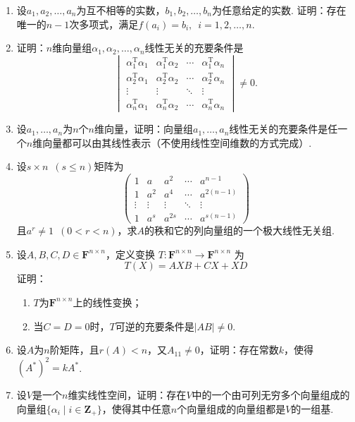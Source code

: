 \begin{enumerate}
    \item 设$a_1,a_2,\ldots,a_n$为互不相等的实数，$b_1,b_2,\ldots,b_n$为任意给定的实数. 证明：存在唯一的$n-1$次多项式，满足$f(a_i)=b_i,\enspace i=1,2,\ldots,n$.

    \item 证明：$n$维向量组$\alpha_1,\alpha_2,\ldots,\alpha_n$线性无关的充要条件是
          \[\begin{vmatrix}
                  \alpha_1^\mathrm{T}\alpha_1 & \alpha_1^\mathrm{T}\alpha_2 & \cdots & \alpha_1^\mathrm{T}\alpha_n \\
                  \alpha_2^\mathrm{T}\alpha_1 & \alpha_2^\mathrm{T}\alpha_2 & \cdots & \alpha_2^\mathrm{T}\alpha_n \\
                  \vdots                      & \vdots                      & \ddots & \vdots                      \\
                  \alpha_n^\mathrm{T}\alpha_1 & \alpha_n^\mathrm{T}\alpha_2 & \cdots & \alpha_n^\mathrm{T}\alpha_n
              \end{vmatrix}\neq 0.\]

    \item 设$a_1,\ldots,a_n$为$n$个$n$维向量，证明：向量组$a_1,\ldots,a_n$线性无关的充要条件是任一个$n$维向量都可以由其线性表示（不使用线性空间维数的方式完成）.

    \item 设$s \times n\enspace(s\leqslant n)$矩阵为
          \[\begin{pmatrix}
                  1      & a      & a^2    & \cdots & a^{n-1}    \\
                  1      & a^2    & a^4    & \cdots & a^{2(n-1)} \\
                  \vdots & \vdots & \vdots & \ddots & \vdots     \\
                  1      & a^s    & a^{2s} & \cdots & a^{s(n-1)}
              \end{pmatrix}\]
          且$a^r\neq 1\enspace(0<r<n)$，求$A$的秩和它的列向量组的一个极大线性无关组.

    \item 设$A,B,C,D \in \mathbf{F}^{n \times n}$，定义变换 $ T : \mathbf{F}^{n \times n} \to \mathbf{F}^{n \times n}$ 为
          \[ T(X) = AXB+CX+XD \]
          证明：
          \begin{enumerate}
              \item $T$为$\mathbf{F}^{n \times n}$上的线性变换；

              \item 当$C=D=0$时，$T$可逆的充要条件是$|AB| \neq 0$.
          \end{enumerate}

    \item 设$A$为$n$阶矩阵，且$r(A) < n$，又$A_{11} \neq 0$，证明：存在常数$k$，使得$(A^*)^2=kA^*$.

    \item 设$V$是一个$n$维实线性空间，证明：存在$V$中的一个由可列无穷多个向量组成的向量组$\{\alpha_i \mid i\in\mathbf{Z}_+\}$，使得其中任意$n$个向量组成的向量组都是$V$的一组基.
\end{enumerate}

